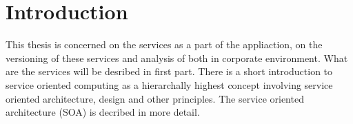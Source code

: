 \chapter{Introduction}
\label{chap:introduction}

This thesis is concerned on the services as a part of the appliaction, on the versioning of these services and analysis of both in corporate environment. What are the services will be desribed in first part. There is a short introduction to service oriented computing as a hierarchally highest concept involving service oriented architecture, design and other principles. The service oriented architecture (SOA) is decribed in more detail. %
